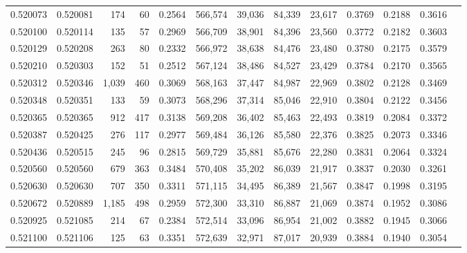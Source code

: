 \begin{tabular}{rrrrrrrrrrrrr}
0.520073 & 0.520081 &   174 &    60 &                                     0.2564 & 566,574 &  39,036 &  84,339 &  23,617 & 0.3769 & 0.2188 & 0.3616 \\
0.520100 & 0.520114 &   135 &    57 &                                     0.2969 & 566,709 &  38,901 &  84,396 &  23,560 & 0.3772 & 0.2182 & 0.3603 \\
0.520129 & 0.520208 &   263 &    80 &                                     0.2332 & 566,972 &  38,638 &  84,476 &  23,480 & 0.3780 & 0.2175 & 0.3579 \\
0.520210 & 0.520303 &   152 &    51 &                                     0.2512 & 567,124 &  38,486 &  84,527 &  23,429 & 0.3784 & 0.2170 & 0.3565 \\
0.520312 & 0.520346 & 1,039 &   460 &                                     0.3069 & 568,163 &  37,447 &  84,987 &  22,969 & 0.3802 & 0.2128 & 0.3469 \\
0.520348 & 0.520351 &   133 &    59 &                                     0.3073 & 568,296 &  37,314 &  85,046 &  22,910 & 0.3804 & 0.2122 & 0.3456 \\
0.520365 & 0.520365 &   912 &   417 &                                     0.3138 & 569,208 &  36,402 &  85,463 &  22,493 & 0.3819 & 0.2084 & 0.3372 \\
0.520387 & 0.520425 &   276 &   117 &                                     0.2977 & 569,484 &  36,126 &  85,580 &  22,376 & 0.3825 & 0.2073 & 0.3346 \\
0.520436 & 0.520515 &   245 &    96 &                                     0.2815 & 569,729 &  35,881 &  85,676 &  22,280 & 0.3831 & 0.2064 & 0.3324 \\
0.520560 & 0.520560 &   679 &   363 &                                     0.3484 & 570,408 &  35,202 &  86,039 &  21,917 & 0.3837 & 0.2030 & 0.3261 \\
0.520630 & 0.520630 &   707 &   350 &                                     0.3311 & 571,115 &  34,495 &  86,389 &  21,567 & 0.3847 & 0.1998 & 0.3195 \\
0.520672 & 0.520889 & 1,185 &   498 &                                     0.2959 & 572,300 &  33,310 &  86,887 &  21,069 & 0.3874 & 0.1952 & 0.3086 \\
0.520925 & 0.521085 &   214 &    67 &                                     0.2384 & 572,514 &  33,096 &  86,954 &  21,002 & 0.3882 & 0.1945 & 0.3066 \\
0.521100 & 0.521106 &   125 &    63 &                                     0.3351 & 572,639 &  32,971 &  87,017 &  20,939 & 0.3884 & 0.1940 & 0.3054 \\

\end{tabular}
